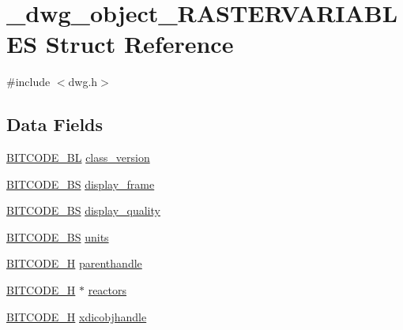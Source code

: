 \hypertarget{struct__dwg__object__RASTERVARIABLES}{\section{\-\_\-dwg\-\_\-object\-\_\-\-R\-A\-S\-T\-E\-R\-V\-A\-R\-I\-A\-B\-L\-E\-S \-Struct \-Reference}
\label{struct__dwg__object__RASTERVARIABLES}
}


{\ttfamily \#include $<$dwg.\-h$>$}

\subsection*{\-Data \-Fields}
\begin{DoxyCompactItemize}
\item 
\hyperlink{dwg_8h_aebd5f127038868cbabc3d55d91da776c}{\-B\-I\-T\-C\-O\-D\-E\-\_\-\-B\-L} \hyperlink{struct__dwg__object__RASTERVARIABLES_a0e1c22e315c96a9e09d42925ba8a6a36}{class\-\_\-version}
\item 
\hyperlink{dwg_8h_a94297606fbd4a4ff97e8add284af0809}{\-B\-I\-T\-C\-O\-D\-E\-\_\-\-B\-S} \hyperlink{struct__dwg__object__RASTERVARIABLES_a913fded8121a0bd02ff96422f1dd1a31}{display\-\_\-frame}
\item 
\hyperlink{dwg_8h_a94297606fbd4a4ff97e8add284af0809}{\-B\-I\-T\-C\-O\-D\-E\-\_\-\-B\-S} \hyperlink{struct__dwg__object__RASTERVARIABLES_a0ea0ceb875e61a4b1078f41da8c73400}{display\-\_\-quality}
\item 
\hyperlink{dwg_8h_a94297606fbd4a4ff97e8add284af0809}{\-B\-I\-T\-C\-O\-D\-E\-\_\-\-B\-S} \hyperlink{struct__dwg__object__RASTERVARIABLES_a30ac6cee12ac6fe5860e8a4384bd9589}{units}
\item 
\hyperlink{dwg_8h_a7c700e94e047a97ba8c24bdfe4029dc3}{\-B\-I\-T\-C\-O\-D\-E\-\_\-\-H} \hyperlink{struct__dwg__object__RASTERVARIABLES_a29d9dd219a97c8d241c0ef9bcbbd78d1}{parenthandle}
\item 
\hyperlink{dwg_8h_a7c700e94e047a97ba8c24bdfe4029dc3}{\-B\-I\-T\-C\-O\-D\-E\-\_\-\-H} $\ast$ \hyperlink{struct__dwg__object__RASTERVARIABLES_acaad5e65206122679f7b601c412314d2}{reactors}
\item 
\hyperlink{dwg_8h_a7c700e94e047a97ba8c24bdfe4029dc3}{\-B\-I\-T\-C\-O\-D\-E\-\_\-\-H} \hyperlink{struct__dwg__object__RASTERVARIABLES_af7d430bc7a2c1919a54ec2395a101dbb}{xdicobjhandle}
\end{DoxyCompactItemize}


